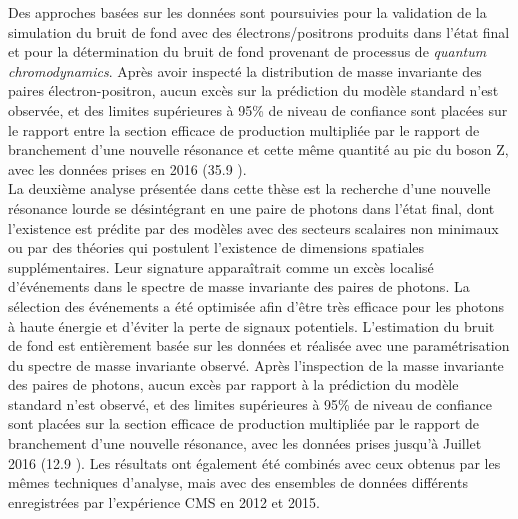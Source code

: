 Des approches basées sur les données sont poursuivies pour la validation de la simulation du bruit de fond avec des électrons/positrons produits dans l'état final et pour la détermination du bruit de fond provenant de processus de \textit{quantum chromodynamics}.
Après avoir inspecté la distribution de masse invariante des paires électron-positron, aucun excès
sur la prédiction du modèle standard n'est observée, et des limites supérieures  à 95\% de niveau de confiance sont placées sur le
rapport entre la section efficace de production multipliée par le rapport de branchement d'une nouvelle résonance et cette même quantité au pic du boson Z, avec les données
prises en 2016 (35.9 \fbinv).
\\La deuxième analyse présentée dans cette thèse est la recherche d'une nouvelle résonance lourde se désintégrant en une paire de photons dans l'état final,
dont l'existence est prédite par des modèles avec des secteurs scalaires non minimaux ou par des théories
qui postulent l'existence de dimensions spatiales supplémentaires.
Leur signature apparaîtrait comme un excès localisé d'événements dans le spectre de masse invariante des paires de photons.
La sélection des événements a été optimisée afin d'être très efficace pour les photons à haute énergie et d'éviter
la perte de signaux potentiels.
L'estimation du bruit de fond est entièrement basée sur les données et réalisée avec une paramétrisation du spectre de masse invariante observé.
Après l'inspection de la masse invariante des paires de photons, aucun excès par rapport à la prédiction du modèle standard n'est observé, et des limites supérieures à 95\% de niveau de confiance sont placées sur la section efficace de production multipliée par le rapport de branchement d'une nouvelle résonance, avec les données
prises jusqu'à Juillet 2016 (12.9 \fbinv).
Les résultats ont également été combinés avec ceux obtenus par les mêmes techniques d'analyse, mais avec des ensembles de données différents enregistrées par l'expérience CMS en 2012 et 2015.
